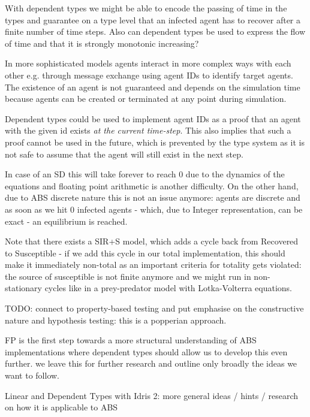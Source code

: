 With dependent types we might be able to encode the passing of time in the types and guarantee on a type level that an infected agent has to recover after a finite number of time steps. Also can dependent types be used to express the flow of time and that it is strongly monotonic increasing?
	
In more sophisticated models agents interact in more complex ways with each other e.g. through message exchange using agent IDs to identify target agents. The existence of an agent is not guaranteed and depends on the simulation time because agents can be created or terminated at any point during simulation. 

Dependent types could be used to implement agent IDs as a proof that an agent with the given id exists \textit{at the current time-step}. This also implies that such a proof cannot be used in the future, which is prevented by the type system as it is not safe to assume that the agent will still exist in the next step. %


In case of an SD this will take forever to reach 0 due to the dynamics of the equations and floating point arithmetic is another difficulty. On the other hand, due to ABS discrete nature this is not an issue anymore: agents are discrete and as soon as we hit 0 infected agents - which, due to Integer representation, can be exact - an equilibrium is reached.

Note that there exists a SIR+S model, which adds a cycle back from Recovered to Susceptible - if we add this cycle in our total implementation, this should make it immediately non-total as an important criteria for totality gets violated: the source of susceptible is not finite anymore and we might run in non-stationary cycles like in a prey-predator model with Lotka-Volterra equations.


TODO: connect to property-based testing and put emphasise on the constructive nature and hypothesis testing: this is a popperian approach.

FP is the first step towards a more structural understanding of ABS implementations where dependent types should allow us to develop this even further. we leave this for further research and outline only broadly the ideas we want to follow.

Linear and Dependent Types with Idris 2: more general ideas / hints / research on how it is applicable to ABS

